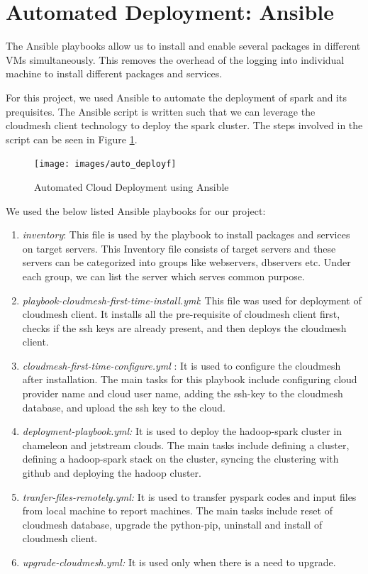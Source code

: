 \documentclass[9pt,twocolumn,twoside]{../../styles/osajnl}
\begin{document}
\section{Automated Deployment: Ansible}
The Ansible playbooks allow us to install and enable several packages in different VMs simultaneously. This removes the overhead of the logging into individual machine to install different packages and services.

For this project, we used Ansible to automate the deployment of spark and its prequisites. The Ansible script is written such that we can leverage the cloudmesh client technology to deploy the spark cluster. The steps involved in the script can be seen in Figure \ref{fig:ansible}.

\begin{figure}[h]
\centering
\texttt{[image: images/auto\_deployf]}
\caption{Automated Cloud Deployment using Ansible}
\label{fig:ansible}
\end{figure}

We used the below listed Ansible playbooks for our project:
\begin{enumerate}
\item \textit{inventory}: This file is used by the playbook to install packages and services on target servers. This Inventory file consists of target servers and these servers can be categorized into groups like webservers, dbservers etc. Under each group, we can list the server which serves common purpose.
\item \textit{playbook-cloudmesh-first-time-install.yml}: This file was used for deployment of cloudmesh client. It installs all the pre-requisite of cloudmesh client first, checks if the ssh keys are already present, and then deploys the cloudmesh client.
\item \textit{cloudmesh-first-time-configure.yml} : It is used to configure the cloudmesh after installation. The main tasks for this playbook include configuring cloud provider name and cloud user name, adding the ssh-key to the cloudmesh database, and upload the ssh key to the cloud.

\item \textit{deployment-playbook.yml:} It is used to deploy the hadoop-spark cluster in chameleon and jetstream clouds. The main tasks include defining a cluster, defining a hadoop-spark stack on the cluster, syncing the clustering with github and deploying the hadoop cluster.

\item  \textit{tranfer-files-remotely.yml:} It is used to transfer pyspark codes and input files from local machine to report machines. The main tasks include reset of cloudmesh database, upgrade the python-pip, uninstall and install of cloudmesh client.

\item \textit{upgrade-cloudmesh.yml:} It is used only when there is a need to upgrade.
\end{enumerate}
\end{document}
